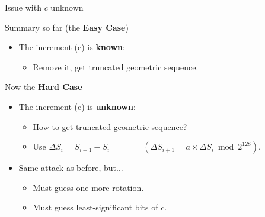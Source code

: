 
\begin{frame}[label=hard]{Issue with $c$ unknown}

  \begin{exampleblock}{Summary so far (the \textbf{Easy Case})}
    \begin{itemize}
    \item The \alert{increment} (\alert{c}) is \textbf{known}:
      \begin{itemize}
      \item Remove it, get truncated geometric sequence.
      \end{itemize}
    \end{itemize}
  \end{exampleblock}
  
  \begin{alertblock}{Now the \textbf{Hard Case}}
    \begin{itemize}
    \item The \alert{increment} (\alert{c}) is \textbf{unknown}:
      \begin{itemize}
      \item How to get truncated geometric sequence?
      \item Use $\Delta S_i = S_{i+1} - S_i \qquad\qquad (\Delta S_{i+1} = a \times \Delta S_i \bmod 2^{128})$.
      \end{itemize}
      \pause
    \item Same attack as before, but...
      \begin{itemize}
    \item Must guess one more rotation.
    \item Must guess least-significant bits of \alert{$c$}.
    \end{itemize}
  \end{itemize}
  \end{alertblock}
\end{frame}



